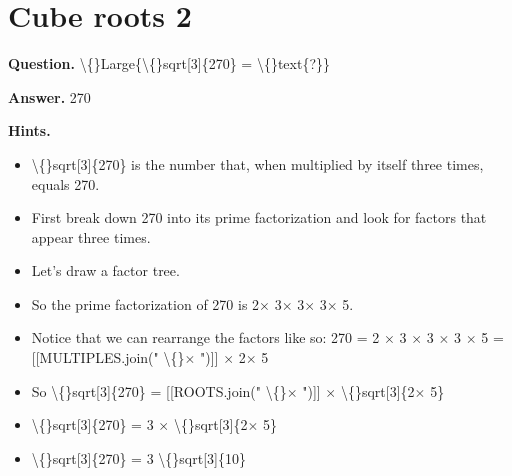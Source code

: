 \documentclass{article}
\begin{document}
\section*{Cube roots 2}
\textbf{Question.} \textbackslash\{\}Large\{\textbackslash\{\}sqrt[3]\{270\} = \textbackslash\{\}text\{?\}\}

\textbf{Answer.} 270

\textbf{Hints.}
\begin{itemize}
  \item \textbackslash\{\}sqrt[3]\{270\} is the number that, when multiplied by itself three times, equals 270.
  \item First break down 270 into its prime factorization and look for factors that appear three times.
  \item Let's draw a factor tree.
  \item So the prime factorization of 270 is 2$\times$ 3$\times$ 3$\times$ 3$\times$ 5.
  \item Notice that we can rearrange the factors like so:
                        270 = 2 $\times$ 3 $\times$ 3 $\times$ 3 $\times$ 5 = 
                            [[MULTIPLES.join(" \textbackslash\{\}$\times$ ")]] $\times$ 2$\times$ 5
  \item So \textbackslash\{\}sqrt[3]\{270\} = 
                        [[ROOTS.join(" \textbackslash\{\}$\times$ ")]] $\times$ \textbackslash\{\}sqrt[3]\{2$\times$ 5\}
  \item \textbackslash\{\}sqrt[3]\{270\} =
                        3 $\times$ \textbackslash\{\}sqrt[3]\{2$\times$ 5\}
  \item \textbackslash\{\}sqrt[3]\{270\} = 3 \textbackslash\{\}sqrt[3]\{10\}
\end{itemize}
\end{document}
